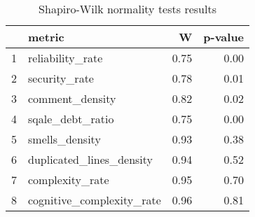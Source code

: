 \begin{table}[ht]
\centering
\begin{tabular}{rlrr}
  \hline
 & metric & W & p-value \\ 
  \hline
1 & reliability\_rate & 0.75 & 0.00 \\ 
  2 & security\_rate & 0.78 & 0.01 \\ 
  3 & comment\_density & 0.82 & 0.02 \\ 
  4 & sqale\_debt\_ratio & 0.75 & 0.00 \\ 
  5 & smells\_density & 0.93 & 0.38 \\ 
  6 & duplicated\_lines\_density & 0.94 & 0.52 \\ 
  7 & complexity\_rate & 0.95 & 0.70 \\ 
  8 & cognitive\_complexity\_rate & 0.96 & 0.81 \\ 
   \hline
\end{tabular}
\caption{Shapiro-Wilk normality tests results} 
\label{tab:normalityTestrewarding}
\end{table}

